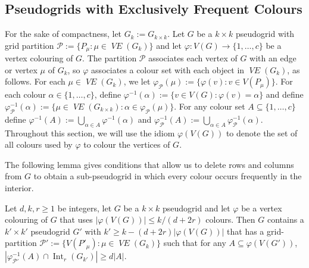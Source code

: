 \documentclass{patmorin}
\DeclareMathOperator{\interior}{Int}
\DeclareMathOperator{\VE}{\mathit{VE}}
\begin{document}
\subsection{Pseudogrids with Exclusively Frequent Colours}
\label{only_frequent_sec}

For the sake of compactness, let $G_k:=G_{k\times k}$.
Let $G$ be a $k\times k$ pseudogrid with grid partition $\mathcal{P}:=\{P_\mu:\mu\in\VE(G_{k})\}$ and let $\varphi:V(G)\to\{1,\ldots,c\}$ be a vertex colouring of $G$.  The partition $\mathcal{P}$ associates each vertex of $G$ with an edge or vertex $\mu$ of $G_k$, so $\varphi$ associates a colour set with each object in $\VE(G_k)$, as follows.  For each $\mu\in\VE(G_{k})$, we let $\varphi_{\mathcal{P}}(\mu):=\{\varphi(v):v\in V(P_\mu)\}$.  For each colour $\alpha\in\{1,\ldots,c\}$, define $\varphi^{-1}(\alpha):=\{v\in V(G):\varphi(v)=\alpha\}$ and define $\varphi_\mathcal{P}^{-1}(\alpha):=\{\mu\in \VE(G_{k\times k}):\alpha\in\varphi_\mathcal{P}(\mu)\}$.  For any colour set $A\subseteq\{1,\ldots,c\}$ define $\varphi^{-1}(A):=\bigcup_{\alpha\in A}\varphi^{-1}(\alpha)$ and $\varphi_\mathcal{P}^{-1}(A):=\bigcup_{\alpha\in A}\varphi_{\mathcal{P}}^{-1}(\alpha)$.  Throughout this section, we will use the idiom $\varphi(V(G))$ to denote the set of all colours used by $\varphi$ to colour the vertices of $G$.

The following lemma gives conditions that allow us to delete rows and columns from $G$ to obtain a sub-pseudogrid in which every colour occurs frequently in the interior.


\begin{lem}\label{only_frequent}
  Let $d,k,r\ge 1$ be integers, let $G$ be a $k\times k$ pseudogrid and let $\varphi$ be a vertex colouring of $G$ that uses $|\varphi(V(G))|\le k/(d+2r)$ colours.
  Then $G$ contains a $k'\times k'$ pseudogrid $G'$ with $k'\ge k - (d+2r)|\varphi(V(G))|$ that has a grid-partition $\mathcal{P}':=\{V(P'_\mu):\mu\in \VE(G_{k})\}$ such that
  for any $A\subseteq \varphi(V(G'))$, $|\varphi_{\mathcal{P}'}^{-1}(A)\cap \interior_r(G_{k'})| \ge d|A|$.
\end{lem}
\end{document}
